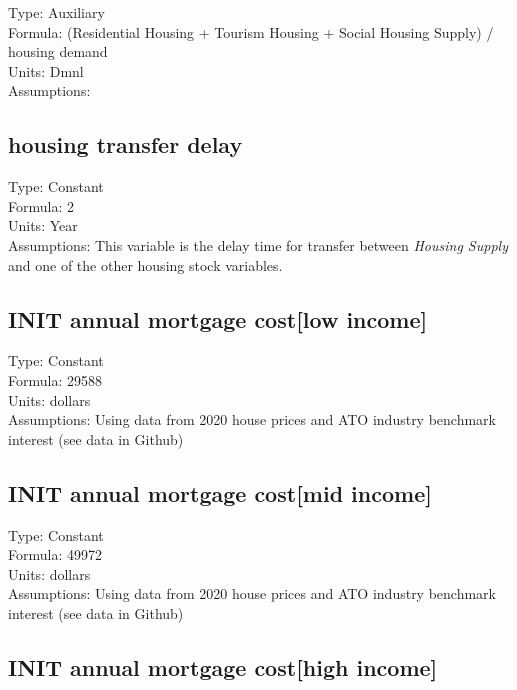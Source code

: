 \documentclass[
  11pt,
]{book}
\begin{document}
Type: Auxiliary\\
Formula: (Residential Housing + Tourism Housing + Social Housing Supply) / housing demand\\
Units: Dmnl\\
Assumptions:

\hypertarget{housing-transfer-delay}{%
\subsection{housing transfer delay}\label{housing-transfer-delay}}

Type: Constant\\
Formula: 2\\
Units: Year\\
Assumptions: This variable is the delay time for transfer between \emph{Housing Supply} and one of the other housing stock variables.

\hypertarget{init-annual-mortgage-costlow-income}{%
\subsection{INIT annual mortgage cost{[}low income{]}}\label{init-annual-mortgage-costlow-income}}

Type: Constant\\
Formula: 29588\\
Units: dollars\\
Assumptions: Using data from 2020 house prices and ATO industry benchmark interest (see data in Github)

\hypertarget{init-annual-mortgage-costmid-income}{%
\subsection{INIT annual mortgage cost{[}mid income{]}}\label{init-annual-mortgage-costmid-income}}

Type: Constant\\
Formula: 49972\\
Units: dollars\\
Assumptions: Using data from 2020 house prices and ATO industry benchmark interest (see data in Github)

\hypertarget{init-annual-mortgage-costhigh-income}{%
\subsection{INIT annual mortgage cost{[}high income{]}}\label{init-annual-mortgage-costhigh-income}}
\end{document}
